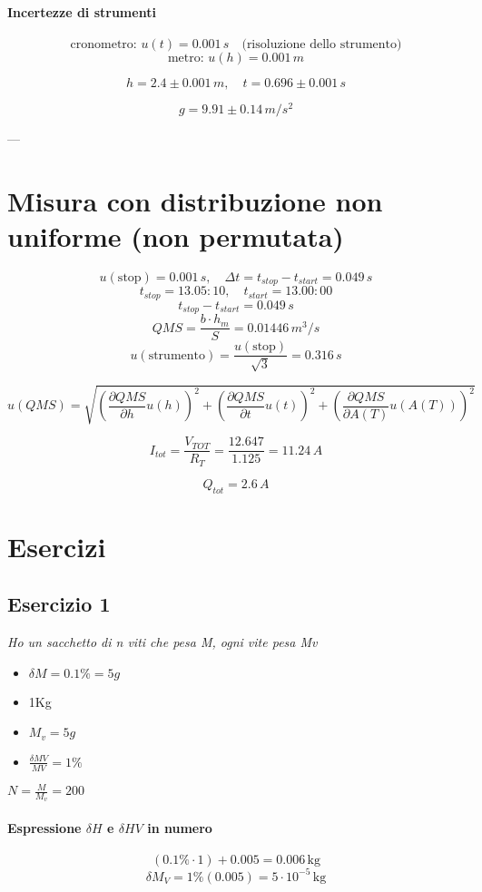 \paragraph{Incertezze di strumenti}
\[
\text{cronometro: } u(t) = 0.001\,s \quad \text{(risoluzione dello strumento)}
\]
\[
\text{metro: } u(h) = 0.001\,m
\]

\[
h = 2.4 \pm 0.001\,m, \quad t = 0.696 \pm 0.001\,s
\]

\[
g = 9.91 \pm 0.14\,m/s^2
\]

---

\section*{Misura con distribuzione non uniforme (non permutata)}

\[
u(\text{stop}) = 0.001\,s, \quad \Delta t = t_{stop} - t_{start} = 0.049\,s
\]
\[
t_{stop} = 13.05:10, \quad t_{start} = 13.00:00
\]
\[
t_{stop} - t_{start} = 0.049\,s
\]
\[
QMS = \frac{b \cdot h_m}{S} = 0.01446\,m^3/s
\]
\[
u(\text{strumento}) = \frac{u(\text{stop})}{\sqrt{3}} = 0.316\,s
\]

\[
u(QMS) = \sqrt{\left( \frac{\partial QMS}{\partial h} u(h) \right)^2 +
\left( \frac{\partial QMS}{\partial t} u(t) \right)^2 +
\left( \frac{\partial QMS}{\partial A(T)} u(A(T)) \right)^2}
\]

\[
I_{tot} = \frac{V_{TOT}}{R_T} = \frac{12.647}{1.125} = 11.24\,A
\]

\[
Q_{tot} = 2.6\,A
\]

\section{Esercizi}
\subsection{Esercizio 1}
    \textit{Ho un sacchetto di n viti che pesa M, ogni vite pesa Mv}

\begin{itemize}
  \item $\delta M= 0.1\% = 5g$
  \item 1Kg
  \item $M_v = 5g$
  \item $\frac{\delta MV}{MV} = 1\%$
\end{itemize}

\noindent
$N=\frac{M}{M_v} = 200$

\paragraph{Espressione $\delta H$ e $\delta HV$ in numero}
\[
(0.1\% \cdot 1) + 0.005 = 0.006\, \text{kg}
\]
\[
\delta M_V = 1\% (0.005) = 5\cdot10^{-5} \, \text{kg}
\]

